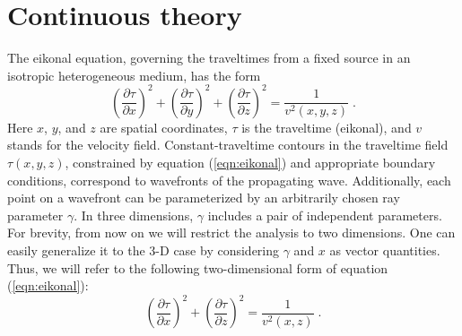 \section{Continuous theory}

The eikonal equation, governing the traveltimes from a fixed source in
an isotropic heterogeneous medium, has the form
\begin{equation}
  \label{eqn:eikonal}
  \left(\frac{\partial \tau}{\partial x}\right)^2 +
  \left(\frac{\partial \tau}{\partial y}\right)^2 +
  \left(\frac{\partial \tau}{\partial z}\right)^2 =
  \frac{1}{v^2(x,y,z)}\;.
\end{equation}
Here $x$, $y$, and $z$ are spatial coordinates, $\tau$ is the
traveltime (eikonal), and $v$ stands for the velocity field.
Constant-traveltime contours in the traveltime field $\tau (x,y,z)$,
constrained by equation (\ref{eqn:eikonal}) and appropriate boundary
conditions, correspond to wavefronts of the propagating wave.
Additionally, each point on a wavefront can be parameterized by an
arbitrarily chosen ray parameter $\gamma$. In three dimensions, $\gamma$
includes a pair of independent parameters. For brevity, from now on we
will restrict the analysis to two dimensions. One can easily generalize
it to the 3-D case by considering $\gamma$ and $x$ as vector quantities.
Thus, we will refer to the following two-dimensional form of equation
(\ref{eqn:eikonal}):
\begin{equation}
  \label{eqn:eiko}
  \left(\frac{\partial \tau}{\partial x}\right)^2 +
  \left(\frac{\partial \tau}{\partial z}\right)^2 =
  \frac{1}{v^2(x,z)}\;.
\end{equation}

